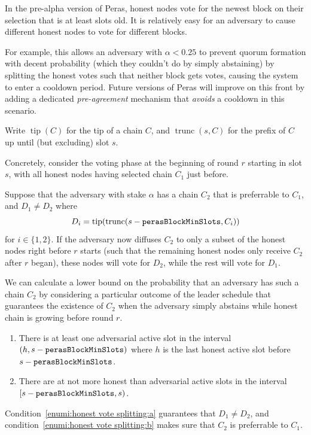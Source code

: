 In the pre-alpha version of Peras, honest nodes vote for the newest block on their selection that is at least \perasBlockMinSlots{} slots old.
It is relatively easy for an adversary to cause different honest nodes to vote for different blocks.

For example, this allows an adversary with $\alpha<0.25$ to prevent quorum formation with decent probability (which they couldn't do by simply abstaining) by splitting the honest votes such that neither block gets \perasQuorum{} votes, causing the system to enter a cooldown period.
Future versions of Peras will improve on this front by adding a dedicated \emph{pre-agreement} mechanism that \emph{avoids} a cooldown in this scenario.

Write $\operatorname{tip}(C)$ for the tip of a chain $C$, and $\operatorname{trunc}(s,C)$ for the prefix of $C$ up until (but excluding) slot $s$.

Concretely, consider the voting phase at the beginning of round $r$ starting in slot $s$, with all honest nodes having selected chain $C_1$ just before.

Suppose that the adversary with stake $\alpha$ has a chain $C_2$ that is preferrable to $C_1$, and $D_1 \neq D_2$ where \[D_i = \operatorname{tip}(\operatorname{trunc}(s-\mathtt{perasBlockMinSlots},C_i))\] for $i\in\{1,2\}$.
If the adversary now diffuses $C_2$ to only a subset of the honest nodes right before $r$ starts (such that the remaining honest nodes only receive $C_2$ after $r$ began), these nodes will vote for $D_2$, while the rest will vote for $D_1$.

We can calculate a lower bound on the probability that an adversary has such a chain $C_2$ by considering a particular outcome of the leader schedule that guarantees the existence of $C_2$ when the adversary simply abstains while honest chain is growing before round $r$.

\begin{enumerate}
\item\label{enumi:honest vote splitting:a}
  There is at least one adversarial active slot in the interval $(h,s-\mathtt{perasBlockMinSlots})$ where $h$ is the last honest active slot before $s-\mathtt{perasBlockMinSlots}$.
\item\label{enumi:honest vote splitting:b}
  There are at not more honest than adversarial active slots in the interval $[s-\mathtt{perasBlockMinSlots}, s)$.
\end{enumerate}
Condition~\ref{enumi:honest vote splitting:a} guarantees that $D_1\neq D_2$, and condition~\ref{enumi:honest vote splitting:b} makes sure that $C_2$ is preferrable to $C_1$.

